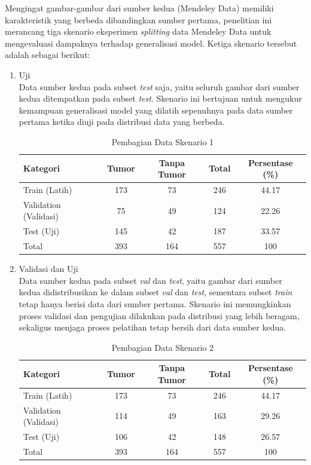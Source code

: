 Mengingat gambar-gambar dari sumber kedua (Mendeley Data) memiliki karakteristik yang berbeda dibandingkan sumber pertama, penelitian ini merancang tiga skenario eksperimen \textit{splitting} data Mendeley Data untuk mengevaluasi dampaknya terhadap generalisasi model. Ketiga skenario tersebut adalah sebagai berikut:
\begin{enumerate}
	\item Uji \\
	Data sumber kedua pada subset \textit{test} saja, yaitu seluruh gambar dari sumber kedua ditempatkan pada subset \textit{test}. Skenario ini bertujuan untuk mengukur kemampuan generalisasi model yang dilatih sepenuhnya pada data sumber pertama ketika diuji pada distribusi data yang berbeda.
	\begin{table}[h]
		\centering
		\begin{tabular}{|l|c|c|c|c|}
			\hline
			\textbf{Kategori}            & \textbf{Tumor} & \textbf{Tanpa Tumor} & \textbf{Total} & \textbf{Persentase (\%)} \\
			\hline
			Train (Latih)       & 173 & 73  & 246 & 44.17 \\ \hline
			Validation (Validasi) & 75  & 49  & 124 & 22.26 \\ \hline
			Test (Uji)          & 145 & 42  & 187 & 33.57 \\ \hline
			Total               & 393 & 164 & 557 & 100 \\ \hline
		\end{tabular}
		\caption{Pembagian Data Skenario 1}
		\label{tab:dataset_test}
	\end{table}
	
	\item Validasi dan Uji \\
	Data sumber kedua pada subset \textit{val} dan \textit{test}, yaitu gambar dari sumber kedua didistribusikan ke dalam subset \textit{val} dan \textit{test}, sementara subset \textit{train} tetap hanya berisi data dari sumber pertama. Skenario ini memungkinkan proses validasi dan pengujian dilakukan pada distribusi yang lebih beragam, sekaligus menjaga proses pelatihan tetap bersih dari data sumber kedua.
	\begin{table}[h]
		\centering
		\begin{tabular}{|l|c|c|c|c|}
			\hline
			\textbf{Kategori}            & \textbf{Tumor} & \textbf{Tanpa Tumor} & \textbf{Total} & \textbf{Persentase (\%)} \\
			\hline
			Train (Latih)       & 173 & 73  & 246 & 44.17 \\ \hline
			Validation (Validasi) & 114 & 49  & 163 & 29.26 \\ \hline
			Test (Uji)          & 106 & 42  & 148 & 26.57 \\ \hline
			Total               & 393 & 164 & 557 & 100 \\ \hline
		\end{tabular}
		\caption{Pembagian Data Skenario 2}
		\label{tab:dataset_val_test}
	\end{table}
	

\end{enumerate}
